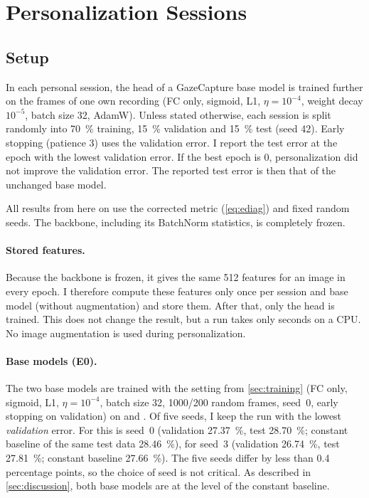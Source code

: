 \section{Personalization Sessions}
\label{sec:sessions}

\subsection{Setup}
\label{sec:sessions_setup}

In each personal session, the head of a GazeCapture base model is trained
further on the frames of one own recording (FC only, sigmoid, L1,
$\eta=10^{-4}$, weight decay $10^{-5}$, batch size 32, AdamW). Unless stated
otherwise, each session is split randomly into \SI{70}{\percent} training,
\SI{15}{\percent} validation and \SI{15}{\percent} test (seed 42). Early
stopping (patience 3) uses the validation error. I report the test error at the
epoch with the lowest validation error. If the best epoch is 0, personalization
did not improve the validation error. The reported test error is then that of
the unchanged base model.

All results from here on use the corrected metric (\cref{eq:ediag}) and fixed
random seeds. The backbone, including its
BatchNorm statistics, is completely frozen.

\paragraph{Stored features.} Because the backbone is frozen, it gives the same 512
features for an image in every epoch. I therefore compute these features only
once per session and base model (without augmentation) and store them. After
that, only the head is trained. This does not change the result, but a run
takes only seconds on a CPU. No image augmentation is used during
personalization.

\paragraph{Base models (E0).} The two base models are trained with the setting
from \cref{sec:training} (FC only, sigmoid, L1, $\eta=10^{-4}$, batch size 32,
\num{1000}/\num{200} random frames, seed~0, early stopping on validation) on
 and . Of five seeds, I keep the run with
the lowest \emph{validation} error. For  this is seed~0 (validation
\SI{27.37}{\percent}, test \SI{28.70}{\percent}; constant baseline of the same
test data \SI{28.46}{\percent}), for  seed~3 (validation
\SI{26.74}{\percent}, test \SI{27.81}{\percent}; constant baseline
\SI{27.66}{\percent}). The five seeds differ by less than \num{0.4} percentage
points, so the choice of seed is not critical. As described in
\cref{sec:discussion}, both base models are at the level of the constant
baseline.

